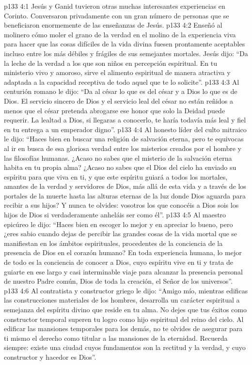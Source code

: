 \vs p133 4:1 Jesús y Ganid tuvieron otras muchas interesantes experiencias en Corinto. Conversaron privadamente con un gran número de personas que se beneficiaron enormemente de las enseñanzas de Jesús.
\vs p133 4:2 \pc Enseñó al molinero cómo moler el grano de la verdad en el molino de la experiencia viva para hacer que las cosas difíciles de la vida divina fuesen prontamente aceptables incluso entre los más débiles y frágiles de sus semejantes mortales. Jesús dijo: “Da la leche de la verdad a los que son niños en percepción espiritual. En tu ministerio vivo y amoroso, sirve el alimento espiritual de manera atractiva y adaptada a la capacidad receptiva de todo aquel que te lo solicite”.
\vs p133 4:3 \pc Al centurión romano le dijo: “Da al césar lo que es del césar y a Dios lo que es de Dios. El servicio sincero de Dios y el servicio leal del césar no están reñidos a menos que el césar pretenda abrogarse ese honor que solo la Deidad puede requerir. La lealtad a Dios, si llegaras a conocerlo, te haría todavía más leal y fiel en tu entrega a un emperador digno”.
\vs p133 4:4 \pc Al honesto líder del culto mitraico le dijo: “Haces bien en buscar una religión de salvación eterna, pero te equivocas al ir en busca de esa gloriosa verdad entre los misterios creados por el hombre y las filosofías humanas. ¿Acaso no sabes que el misterio de la salvación eterna habita en tu propia alma? ¿Acaso no sabes que el Dios del cielo ha enviado su espíritu para que viva en ti, y que este espíritu guiará a todos los mortales, amantes de la verdad y servidores de Dios, más allá de esta vida y a través de los portales de la muerte hasta las alturas eternas de la luz donde Dios aguarda para recibir a sus hijos? Y nunca te olvides: vosotros los que conocéis a Dios sois los hijos de Dios si verdaderamente anheláis ser como él”.
\vs p133 4:5 \pc Al maestro epicúreo le dijo: “Haces bien en escoger lo mejor y en apreciar lo bueno, pero ¿eres sabio cuando dejas de percibir las grandes cosas de la vida mortal que se manifiestan en los ámbitos espirituales, procedentes de la conciencia de la presencia de Dios en el corazón humano? En toda experiencia humana, lo mejor de todo es la conciencia de conocer a Dios, cuyo espíritu vive en ti y trata de guiarte en ese largo y casi interminable viaje para alcanzar la presencia personal de nuestro Padre común, Dios de toda la creación, el Señor de los universos”.
\vs p133 4:6 \pc Al contratista y constructor griego le dijo: “Amigo mío, mientras edificas las construcciones materiales de los hombres, desarrolla un carácter espiritual a semejanza del espíritu divino que reside en tu alma. No dejes que tus éxitos como constructor temporal superen tu logro como hijo espiritual del reino del cielo. Al edificar las mansiones temporales para los demás, no te olvides de asegurar para ti mismo el derecho como titular a las mansiones de la eternidad. Recuerda siempre: existe una ciudad cuyos fundamentos son la rectitud y la verdad, y cuyo constructor y hacedor es Dios”.
